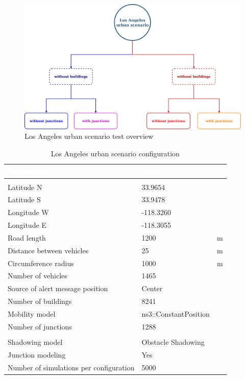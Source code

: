 		\begin{figure}[H]
			\centering
			\includegraphics[width=1.0\textwidth]{immagini/la-25/overview}
			\caption{Los Angeles urban scenario test overview}
			\label{fig:la-overview}
		\end{figure}
	
		\begin{table}[H]
			\def\arraystretch{1.1}
			\begin{tabularx}{\textwidth}{l | l  l}
				\rowcolor{I} {\large \textcolor{white}{Parameter}} & {\large \textcolor{white}{Value}} & {\large \textcolor{white}{}} \TBstrut  \\
				\toprule
				\endhead
				\rowcolor{P} \multicolumn{3}{c}{Scenario configuration} \\
				\midrule[1pt]
				Latitude N								& 33.9654				& \textdegree		\\
				Latitude S								& 33.9478				& \textdegree		\\
				Longitude W								& -118.3260				& \textdegree		\\
				Longitude E								& -118.3055				& \textdegree		\\
				Road length 							& 1200	 				& m		\\
				Distance between vehicles 				& 25					& m		\\
				Circumference radius					& 1000					& m		\\
				Number of vehicles						& 1465					& 		\\
				Source of alert message position		& Center				&		\\
				Number of buildings						& 8241					&		\\
				Mobility model							& ns3::ConstantPosition	&		\\
				Number of junctions						& 1288					&		\\	
				\midrule[1pt]
				\rowcolor{P} \multicolumn{3}{c}{Network configuration} \\
				\midrule[1pt]
				Shadowing model							& Obstacle Shadowing 	&		\\
				Junction modeling						& Yes					&		\\
				\midrule[1pt]
				Number of simulations per configuration	& 5000					&		\\
				\bottomrule
			\end{tabularx}
			\caption{Los Angeles urban scenario configuration}
			\label{tab:la-25}
		\end{table}
	
